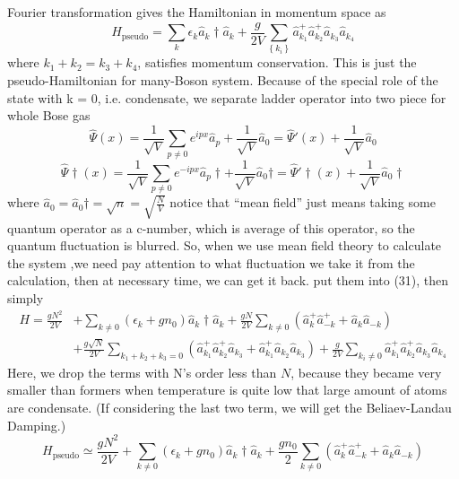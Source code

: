 Fourier transformation gives the Hamiltonian in momentum space as
\begin{equation}
H_{\text{pseudo}}=\sum_k\epsilon_k\hat{a}_k\dagger\hat{a}_k+\frac{g}{2V}\sum _{\left\{k_i\right\}}\hat{a}_{k_1}^+\hat{a}_{k_2}^+\hat{a}_{k_3}\hat{a}_{k_4}
\end{equation}
where $k_1+k_2=k_3+k_4$, satisfies momentum conservation. This is just the pseudo-Hamiltonian for many-Boson system.
Because of the special role of the state with k = 0, i.e. condensate, we separate ladder operator into two piece for whole Bose gas
\begin{equation}
\hat{\Psi }(x)=\frac{1}{\sqrt{V}}\sum _{p\neq 0} e^{i p x}\hat{a}_p+\frac{1}{\sqrt{V}}\hat{a}_0=\hat{\Psi }'(x)+\frac{1}{\sqrt{V}}\hat{a}_0
\end{equation}
\begin{equation}
\hat{\Psi }\dagger(x)=\frac{1}{\sqrt{V}}\sum _{p\neq 0} e^{-i p x}\hat{a}_p\dagger+\frac{1}{\sqrt{V}}\hat{a}_0\dagger=\hat{\Psi }'\dagger(x)+\frac{1}{\sqrt{V}}\hat{a}_0\dagger
\end{equation}
where $\hat{a}_0=\hat{a}_0\dagger=\sqrt{n}=\sqrt{\frac{N}{V}}$
notice that {``}mean field{''} just means taking some quantum operator as a c-number, which is average of this operator, so the quantum fluctuation is blurred. So, when we use mean field theory to calculate the system ,we need pay attention to what fluctuation we take it from the calculation, then at necessary time, we can get it back.
put them into (31), then simply
\begin{equation}
\begin{split}
H=\frac{g N^2}{2V}&+\sum_{k\neq0}\left(\epsilon_k+gn_0\right)\hat{a}_k\dagger\hat{a}_k+\frac{gN}{2V}\sum_{k\neq0}\left(\hat{a}_k^+\hat{a}_{-k}^++\hat{a}_k\hat{a}_{-k}\right)\\
&+\frac{g\sqrt{N}}{2V}\sum_{k_1+k_2+k_3=0}\left(\hat{a}_{k_1}^+\hat{a}_{k_2}^+\hat{a}_{k_3}+\hat{a}_{k_1}^+\hat{a}_{k_2}\hat{a}_{k_3}\right)+\frac{g}{2V}\sum_{k_i\neq0}\hat{a}_{k_1}^+\hat{a}_{k_2}^+\hat{a}_{k_3}\hat{a}_{k_4}
\end{split}
\end{equation}
Here, we drop the terms with N's order less than $N$, because they became very smaller than formers when temperature is quite low that large amount of atoms are condensate. (If considering the last two term, we will get the Beliaev-Landau Damping.)
\begin{equation}
H_{\text{pseudo}}\simeq\frac{gN^2}{2V}+\sum_{k\neq0}\left(\epsilon _k+g n_0\right)\hat{a}_k\dagger\hat{a}_k+\frac{gn_0}{2}\sum_{k\neq0}\left(\hat{a}_k^+\hat{a}_{-k}^++\hat{a}_k\hat{a}_{-k}\right)\end{equation}
